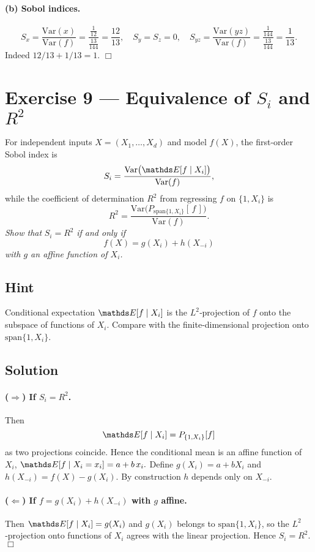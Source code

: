 \documentclass[a4paper]{article}
\begin{document}
\paragraph{(b) Sobol indices.}
\[
S_x = \frac{\text{Var}(x)}{\text{Var}(f)}
    = \frac{\tfrac1{12}}{\tfrac{13}{144}}
    = \frac{12}{13}, 
\quad
S_y = S_z = 0,
\quad
S_{yz}
= \frac{\text{Var}(yz)}{\text{Var}(f)}
= \frac{\tfrac1{144}}{\tfrac{13}{144}}
= \frac{1}{13}.
\]
Indeed $12/13 + 1/13 = 1$.  \hfill\(\Box\)

\section*{Exercise 9 — Equivalence of $S_i$ and $R^2$}
\label{ex:Sobol_R2_improved}

For independent inputs $X=(X_1,\dots,X_d)$ and model $f(X)$, the first‐order Sobol index is
\[
S_i = \frac{\text{Var}\bigl(\E[f\mid X_i]\bigr)}{\text{Var}(f)},
\]
while the coefficient of determination $R^2$ from regressing $f$ on
$\{1,X_i\}$ is
\[
R^2 = \frac{\text{Var}\bigl(P_{\mathrm{span}\{1,X_i\}}[\,f\,]\bigr)}{\text{Var}(f)}.
\]
\emph{Show that }$S_i = R^2$ \emph{if and only if}
\[
f(X) = g(X_i) + h(X_{-i})
\]
\emph{with $g$ an affine function of $X_i$.}

\subsection*{Hint}
Conditional expectation $\E[f\mid X_i]$ is the $L^2$‐projection of $f$
onto the subspace of functions of $X_i$.  Compare with the finite‐dimensional
projection onto $\mathrm{span}\{1,X_i\}$.

\subsection*{Solution}

\paragraph{($\Rightarrow$) If $S_i=R^2$.}
Then 
\[
\E[f\mid X_i]
= P_{\{1,X_i\}}[f]
\]
as two projections coincide.  Hence the conditional mean is an affine
function of $X_i$,
\(
\E[f\mid X_i=x_i] = a + b\,x_i.
\)
Define $g(X_i)=a+bX_i$ and $h(X_{-i})=f(X)-g(X_i)$.  By construction
$h$ depends only on $X_{-i}$.

\paragraph{($\Leftarrow$) If $f=g(X_i)+h(X_{-i})$ with $g$ affine.}
Then
\(
\E[f\mid X_i] = g(X_i)
\)
and $g(X_i)$ belongs to $\mathrm{span}\{1,X_i\}$, so the
$L^2$‐projection onto functions of $X_i$ agrees with the linear projection.
Hence $S_i=R^2$.  \hfill\(\Box\)
\end{document}
